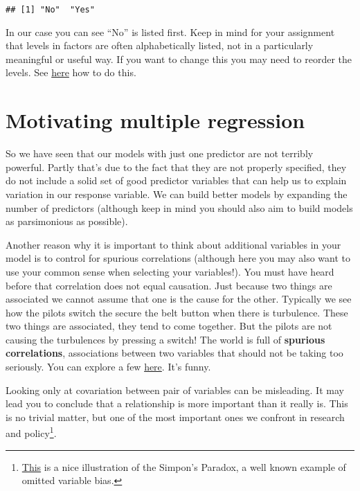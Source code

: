 \documentclass[
]{book}
\begin{document}
\begin{verbatim}
## [1] "No"  "Yes"
\end{verbatim}

In our case you can see ``No'' is listed first. Keep in mind for your assignment that levels in factors are often alphabetically listed, not in a particularly meaningful or useful way.
If you want to change this you may need to reorder the levels. See \href{https://forcats.tidyverse.org/reference/fct_relevel.html}{here} how to do this.

\section{Motivating multiple regression}\label{motivating-multiple-regression}

So we have seen that our models with just one predictor are not terribly powerful. Partly that's due to the fact that they are not properly specified, they do not include a solid set of good predictor variables that can help us to explain variation in our response variable. We can build better models by expanding the number of predictors (although keep in mind you should also aim to build models as parsimonious as possible).

Another reason why it is important to think about additional variables in your model is to control for spurious correlations (although here you may also want to use your common sense when selecting your variables!). You must have heard before that correlation does not equal causation. Just because two things are associated we cannot assume that one is the cause for the other. Typically we see how the pilots switch the secure the belt button when there is turbulence. These two things are associated, they tend to come together. But the pilots are not causing the turbulences by pressing a switch! The world is full of \textbf{spurious correlations}, associations between two variables that should not be taking too seriously. You can explore a few \href{http://tylervigen.com/}{here}. It's funny.

Looking only at covariation between pair of variables can be misleading. It may lead you to conclude that a relationship is more important than it really is. This is no trivial matter, but one of the most important ones we confront in research and policy\footnote{\href{http://vudlab.com/simpsons/}{This} is a nice illustration of the Simpon's Paradox, a well known example of omitted variable bias.}.
\end{document}
